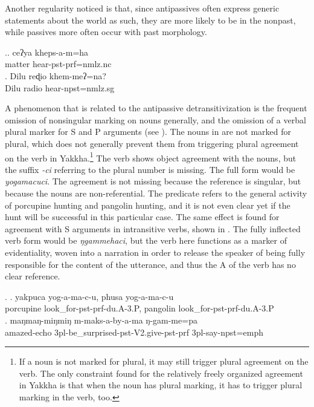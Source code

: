 Another regularity noticed is that, since antipassives often express generic statements about the world as such, they are more likely to be in the nonpast, while passives more often occur with past morphology.

\ex.\ag. ceʔya kheps-a-m=ha\\
matter hear{\sc [3sg]-pst-prf=nmlz.nc}\\
 
\bg. Dilu  reɖio khem-meʔ=na?\\
Dilu radio  hear{\sc [3sg]-npst=nmlz.sg}\\


A  phenomenon that is related to the antipassive detransitivization is the frequent omission of nonsingular marking on nouns generally, and the omission of a verbal plural marker for S and P arguments (see ). The nouns in \Next[a] are not marked for plural, which does  not generally prevent them from triggering plural agreement on the verb in Yakkha.\footnote{If a noun is not marked for plural, it may still trigger plural agreement on the verb. The only constraint found for the relatively freely organized agreement in Yakkha is that when the noun has plural marking, it has to trigger plural marking in the verb, too.} The verb shows object agreement with the nouns, but the suffix \emph{-ci} referring to the plural number is missing. The full form would be  \emph{yogamacuci}. The agreement is not missing because the reference is singular, but because the nouns are non-referential. The predicate refers to the general activity of porcupine hunting and pangolin hunting, and it is not even clear yet if the hunt will be successful in this particular case. The same effect is found for agreement with S arguments in intransitive verbs, shown in \Next[b]. The fully inflected verb form would be \emph{ŋgammehaci}, but the verb here functions as a marker of evidentiality, woven into a narration in order to release the speaker of being fully responsible for the content of the utterance, and thus the A of the verb has no clear reference.


\ex. \ag. yakpuca   yog-a-ma-c-u, phusa    yog-a-ma-c-u\\
porcupine   look\_for{\sc -pst-prf-du.A-3.P}, pangolin   look\_for{\sc -pst-prf-du.A-3.P}\\
 
\bg. maŋmaŋ-miŋmiŋ m-maks-a-by-a-ma ŋ-gam-me=pa\\
	amazed{\sc -echo} {\sc 3pl-}be\_surprised{\sc -pst-V2.give-pst-prf} {\sc 3pl-}say{\sc -npst=emph}\\
	 
	


